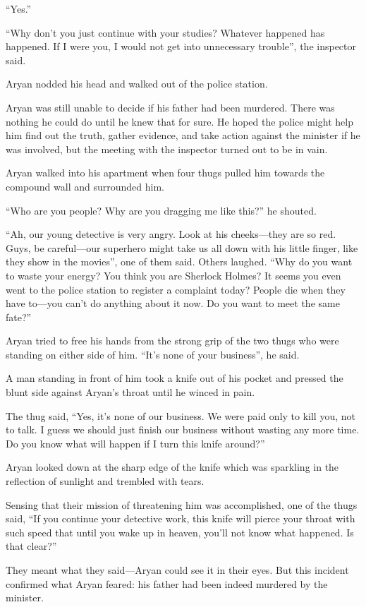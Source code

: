“Yes.”

“Why don't you just continue with your studies? Whatever happened has happened.
If I were you, I would not get into unnecessary trouble”, the inspector said.

Aryan nodded his head and walked out of the police station.

Aryan was still unable to decide if his father had been murdered. There was nothing
he could do until he knew that for sure. He hoped the police might help him find
out the truth, gather evidence, and take action against the minister if he was
involved, but the meeting with the inspector turned out to be in vain.

Aryan walked into his apartment when four thugs pulled him towards the compound
wall and surrounded him.

“Who are you people? Why are you dragging me like this?” he shouted.

“Ah, our young detective is very angry. Look at his cheeks—they are so red.
Guys, be careful—our superhero might take us all down with his little finger,
like they show in the movies”, one of them said. Others laughed. “Why do you
want to waste your energy? You think you are Sherlock Holmes? It seems you even
went to the police station to register a complaint today? People die when they
have to—you can't do anything about it now. Do you want to meet the same fate?”

Aryan tried to free his hands from the strong grip of the two thugs who were
standing on either side of him. “It's none of your business”, he said.

A man standing in front of him took a knife out of his pocket and pressed the
blunt side against Aryan's throat until he winced in pain.

The thug said, “Yes, it's none of our business. We were paid only to kill you,
not to talk. I guess we should just finish our business without wasting any more
time. Do you know what will happen if I turn this knife around?”

Aryan looked down at the sharp edge of the knife which was sparkling in the
reflection of sunlight and trembled with tears.

Sensing that their mission of threatening him was accomplished, one of the thugs
said, “If you continue your detective work, this knife will pierce your
throat with such speed that until you wake up in heaven, you'll not know what
happened. Is that clear?”

They meant what they said—Aryan could see it in their eyes. But this incident
confirmed what Aryan feared: his father had been indeed murdered by the minister.